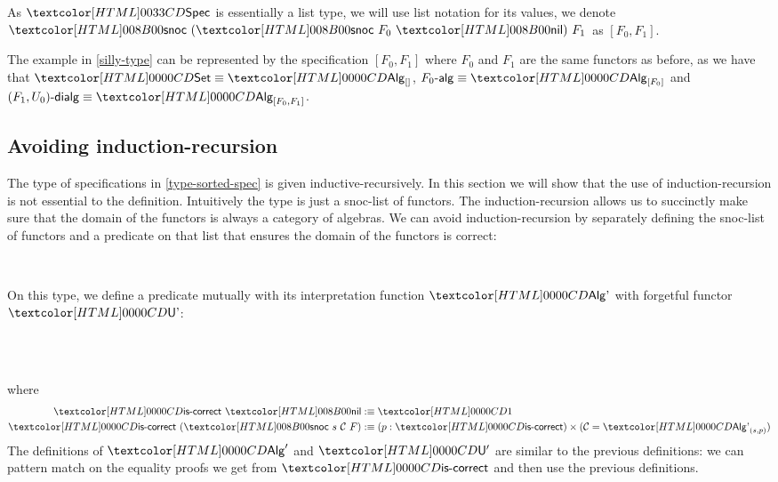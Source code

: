 As $\specty$ is essentially a list type, we will use list notation for
its values, \eg we denote $\specsnoc\ (\specsnoc\ F_0\ \specnil)\ F_1$
as $[F_0,F_1]$.

\begin{example}
  The example in \cref{silly-type} can be represented by the
  specification $[F_0, F_1]$ where $F_0$ and $F_1$ are the same
  functors as before, as we have that $\Set \defeq \Alg_{[]}$,
  $\algcat{F_0} \defeq \Alg_{[F_0]}$ and
  $\dialgcat{F_1}{U_0} \defeq \Alg_{[F_0,F_1]}$.
\end{example}

\subsection{Avoiding induction-recursion}
\label{avoiding-induction-recursion}

The type of specifications in \cref{type-sorted-spec} is given
inductive-recursively. In this section we will show that the use of
induction-recursion is not essential to the definition. Intuitively
the type is just a snoc-list of functors. The induction-recursion
allows us to succinctly make sure that the domain of the functors is
always a category of algebras. We can avoid induction-recursion by
separately defining the snoc-list of functors and a predicate on that
list that ensures the domain of the functors is correct:

\begin{definition}
  \begin{datatype}{\specaltty}{\Set}
    \constr{\specaltnil}{\specaltty} \\
    \constr{\specaltsnoc}{\specaltty \to (\Cc : \Cat)\ (\Func{\Cc}{\Set}) \to \specaltty}
  \end{datatype}
  On this type, we define a predicate mutually with its interpretation
  function $\Algalt$ with forgetful functor $\Undalt$:
  \begin{sorts}
    \functy{\specaltiscorrect}{\specaltty \to \Set} \\
     \\
  \end{sorts}
  where
  \begin{align*}
    \specaltiscorrect\ \specaltnil &\ddefeq \unitty \\
    \specaltiscorrect\ (\specaltsnoc\ s\ \Cc\ F) &\ddefeq (p : \specaltiscorrect) \times (\Cc = \Algalt_{(s,p)})
  \end{align*}
  The definitions of $\Alg'$ and $\Und'$ are similar to the previous
  definitions: we can pattern match on the equality proofs we get from
  $\specaltiscorrect$ and then use the previous definitions.
\end{definition}

